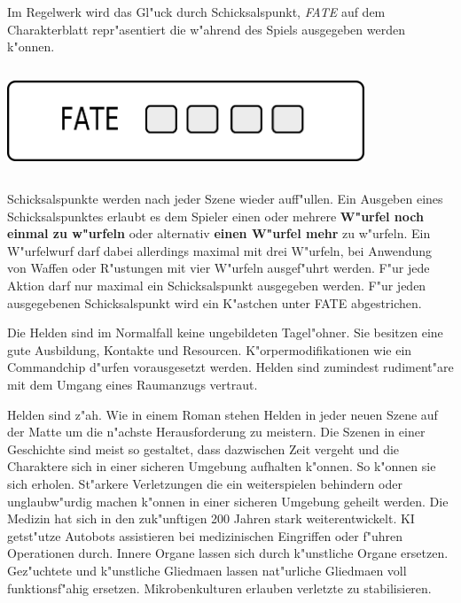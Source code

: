 \begin{column}[l]{0.52}
    Im Regelwerk wird das Gl"uck durch Schicksalspunkt, \emph{FATE} auf dem Charakterblatt repr"asentiert die w"ahrend des Spiels ausgegeben werden k"onnen.
\end{column}
\begin{column}[r]{0.48}
    \centering
    \includegraphics[width=0.80\textwidth]{images/character_fate.png}    
\end{column}

Schicksalspunkte werden nach jeder Szene wieder auff"ullen. Ein Ausgeben eines Schicksalspunktes erlaubt es dem Spieler einen oder mehrere \textbf{W"urfel noch einmal zu w"urfeln} oder alternativ \textbf{einen W"urfel mehr} zu w"urfeln. Ein W"urfelwurf darf dabei allerdings maximal mit drei W"urfeln, bei Anwendung von Waffen oder R"ustungen mit vier W"urfeln ausgef"uhrt werden. F"ur jede Aktion darf nur maximal ein Schicksalspunkt ausgegeben werden. F"ur jeden ausgegebenen Schicksalspunkt wird ein K"astchen unter FATE abgestrichen.

Die Helden sind im Normalfall keine ungebildeten Tagel"ohner. Sie besitzen eine gute Ausbildung, Kontakte und Resourcen. K"orpermodifikationen wie ein Commandchip d"urfen vorausgesetzt werden. Helden sind zumindest rudiment"are mit dem Umgang eines Raumanzugs vertraut.

Helden sind z"ah. Wie in einem Roman stehen Helden in jeder neuen Szene auf der Matte um die n"achste Herausforderung zu meistern. Die Szenen in einer Geschichte sind meist so gestaltet, dass dazwischen Zeit vergeht und die Charaktere sich in einer sicheren Umgebung aufhalten k"onnen. So k"onnen sie sich erholen. St"arkere Verletzungen die ein weiterspielen behindern oder unglaubw"urdig machen k"onnen in einer sicheren Umgebung geheilt werden. Die Medizin hat sich in den zuk"unftigen 200 Jahren stark weiterentwickelt. KI getst"utze Autobots assistieren bei medizinischen Eingriffen oder f"uhren Operationen durch. Innere Organe lassen sich durch k"unstliche Organe ersetzen. Gez"uchtete und k"unstliche Gliedma\3en lassen nat"urliche Gliedma\3en voll funktionsf"ahig ersetzen. Mikrobenkulturen erlauben verletzte zu stabilisieren.


